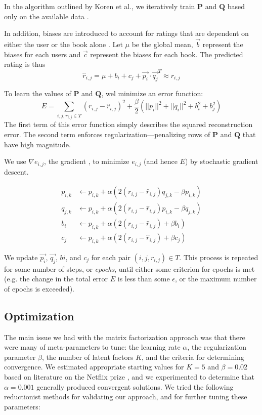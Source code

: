 \documentclass[11pt]{amsart}
\newcommand{\mat}[1]{\mathbf{#1}}
\begin{document}
In the algorithm outlined by Koren et al., we iteratively train $\mat{P}$ and $\mat{Q}$ based only on the available data \cite{Koren:2009uc}.

In addition, biases are introduced to account for ratings that are dependent on either the user or the book alone \cite{Paterek:2007va,Koren:2009uc}.  Let $\mu$ be the global mean, $\vec{b}$ represent the biases for each users and $\vec{c}$ represent the biases for each book. The predicted rating is thus 
$$\hat{r}_{i,j} = \mu + b_i + c_j + \vec{p_i} \cdot \vec{q_j}^T \approx r_{i,j}$$

To learn the values of $\mat{P}$ and $\mat{Q}$, wel minimize an error function:
$$E = \sum_{i,j,r_{i,j} \in T} \left(r_{i,j} - \hat{r}_{i,j}\right)^2 + \frac{\beta}{2} \left( ||p_i||^2 + ||q_i||^2 + b_i^2 + b_j^2 \right) $$
The first term of this error function simply describes the squared reconstruction error. The second term enforces regularization---penalizing rows of $\mat{P}$ and $\mat{Q}$ that have high magnitude. 

We use $\nabla e_{i,j}$, the gradient , to minimize $e_{i,j}$ (and hence $E$) by stochastic gradient descent.

\begin{align*}
p_{i,k} &\gets p_{i,k} + \alpha \left(2 \left(r_{i,j} - \hat{r}_{i,j}\right)  q_{j,k} - \beta p_{i,k} \right) \\
q_{j,k} &\gets p_{i,k} + \alpha \left(2 \left(r_{i,j} - \hat{r}_{i,j}\right)  p_{i,k} - \beta q_{j,k} \right) \\
b_{i}   &\gets p_{i,k} + \alpha \left(2 \left(r_{i,j} - \hat{r}_{i,j}\right)          + \beta b_{i}   \right) \\
c_{j}   &\gets p_{i,k} + \alpha \left(2 \left(r_{i,j} - \hat{r}_{i,j}\right)          + \beta c_{j}   \right)
\end{align*}

We update $\vec{p_i}$, $\vec{q_j}$, $b{i}$, and $c_{j}$ for each pair $(i, j, r_{i,j}) \in T$. This process is repeated for some number of steps, or \emph{epochs}, until either some criterion for epochs is met (e.g. the change in the total error $E$ is less than some $\epsilon$, or the maximum number of epochs is exceeded). 

\subsection{Optimization}
The main issue we had with the matrix factorization approach was that there were many of meta-parameters to tune: the learning rate $\alpha$, the regularization parameter $\beta$, the number of latent factors $K$, and the criteria for determining convergence. We estimated appropriate starting values for $K = 5$ and $\beta = 0.02$ based on literature on the Netflix prize \cite{Mnih:2007wg,Ott:2008tu}, and we experimented to determine that $\alpha = 0.001$ generally produced convergent solutions. We tried the following reductionist methods for validating our approach, and for further tuning these parameters:
\end{document}

